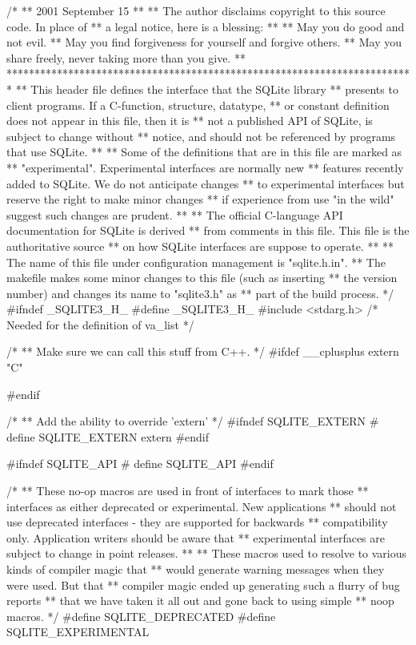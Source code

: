 \begin{Codex}[label=sqlite3.h,numbers=left]
/*
** 2001 September 15
**
** The author disclaims copyright to this source code.  In place of
** a legal notice, here is a blessing:
**
**    May you do good and not evil.
**    May you find forgiveness for yourself and forgive others.
**    May you share freely, never taking more than you give.
**
*************************************************************************
** This header file defines the interface that the SQLite library
** presents to client programs.  If a C-function, structure, datatype,
** or constant definition does not appear in this file, then it is
** not a published API of SQLite, is subject to change without
** notice, and should not be referenced by programs that use SQLite.
**
** Some of the definitions that are in this file are marked as
** "experimental".  Experimental interfaces are normally new
** features recently added to SQLite.  We do not anticipate changes
** to experimental interfaces but reserve the right to make minor changes
** if experience from use "in the wild" suggest such changes are prudent.
**
** The official C-language API documentation for SQLite is derived
** from comments in this file.  This file is the authoritative source
** on how SQLite interfaces are suppose to operate.
**
** The name of this file under configuration management is "sqlite.h.in".
** The makefile makes some minor changes to this file (such as inserting
** the version number) and changes its name to "sqlite3.h" as
** part of the build process.
*/
#ifndef _SQLITE3_H_
#define _SQLITE3_H_
#include <stdarg.h>     /* Needed for the definition of va_list */

/*
** Make sure we can call this stuff from C++.
*/
#ifdef __cplusplus
extern "C" {
#endif


/*
** Add the ability to override 'extern'
*/
#ifndef SQLITE_EXTERN
# define SQLITE_EXTERN extern
#endif

#ifndef SQLITE_API
# define SQLITE_API
#endif


/*
** These no-op macros are used in front of interfaces to mark those
** interfaces as either deprecated or experimental.  New applications
** should not use deprecated interfaces - they are supported for backwards
** compatibility only.  Application writers should be aware that
** experimental interfaces are subject to change in point releases.
**
** These macros used to resolve to various kinds of compiler magic that
** would generate warning messages when they were used.  But that
** compiler magic ended up generating such a flurry of bug reports
** that we have taken it all out and gone back to using simple
** noop macros.
*/
#define SQLITE_DEPRECATED
#define SQLITE_EXPERIMENTAL

}
\end{Codex}
